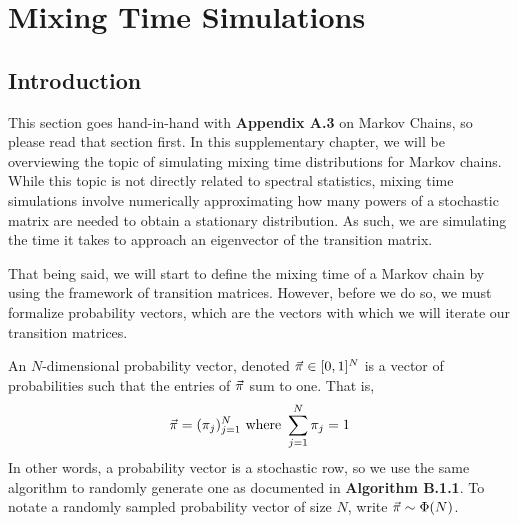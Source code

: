 \chapter{Mixing Time Simulations}
\section{Introduction}

This section goes hand-in-hand with \textbf{Appendix A.3} on Markov Chains, so please read that section first.
In this supplementary chapter, we will be overviewing the topic of simulating mixing time distributions for Markov chains.
While this topic is not directly related to spectral statistics,
mixing time simulations involve numerically approximating how many powers of a stochastic matrix are needed to obtain a stationary distribution.
As such, we are simulating the time it takes to approach an eigenvector of the transition matrix.
%

That being said, we will start to define the mixing time of a Markov chain by using the framework of transition matrices.
However, before we do so, we must formalize probability vectors, which are the vectors with which we will iterate our transition matrices.


\begin{definition}
An $N$-dimensional probability vector, denoted $\vec{\pi} \in [0,1]^N$ is a vector of probabilities such that the entries of $\vec{\pi}$ sum to one. That is,
$$\vec{\pi} = (\pi_j)_{j = 1}^N \text{ where } \sum_{j = 1}^N \pi_j = 1$$
In other words, a probability vector is a stochastic row, so we use the same algorithm to randomly generate one as documented in \textbf{Algorithm B.1.1}.
To notate a randomly sampled probability vector of size $N$, write $\vec{\pi} \sim \Phi(N)$.

\end{definition}


